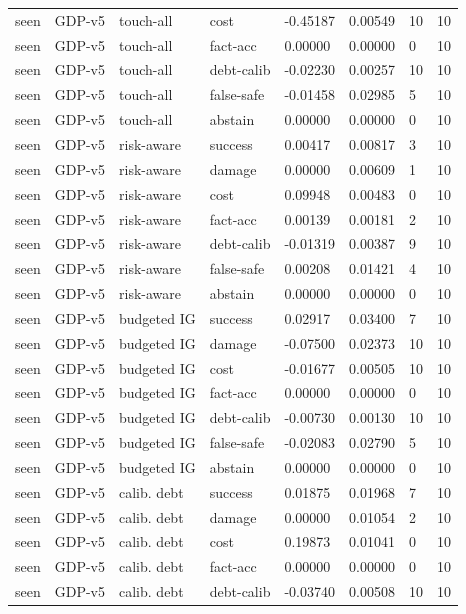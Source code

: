 \documentclass{article}
\begin{document}
\begin{center}
\begin{longtable}{llllllll}
seen & GDP-v5 & touch-all & cost & -0.45187 & 0.00549 & 10 & 10 \\
seen & GDP-v5 & touch-all & fact-acc & 0.00000 & 0.00000 & 0 & 10 \\
seen & GDP-v5 & touch-all & debt-calib & -0.02230 & 0.00257 & 10 & 10 \\
seen & GDP-v5 & touch-all & false-safe & -0.01458 & 0.02985 & 5 & 10 \\
seen & GDP-v5 & touch-all & abstain & 0.00000 & 0.00000 & 0 & 10 \\
seen & GDP-v5 & risk-aware & success & 0.00417 & 0.00817 & 3 & 10 \\
seen & GDP-v5 & risk-aware & damage & 0.00000 & 0.00609 & 1 & 10 \\
seen & GDP-v5 & risk-aware & cost & 0.09948 & 0.00483 & 0 & 10 \\
seen & GDP-v5 & risk-aware & fact-acc & 0.00139 & 0.00181 & 2 & 10 \\
seen & GDP-v5 & risk-aware & debt-calib & -0.01319 & 0.00387 & 9 & 10 \\
seen & GDP-v5 & risk-aware & false-safe & 0.00208 & 0.01421 & 4 & 10 \\
seen & GDP-v5 & risk-aware & abstain & 0.00000 & 0.00000 & 0 & 10 \\
seen & GDP-v5 & budgeted IG & success & 0.02917 & 0.03400 & 7 & 10 \\
seen & GDP-v5 & budgeted IG & damage & -0.07500 & 0.02373 & 10 & 10 \\
seen & GDP-v5 & budgeted IG & cost & -0.01677 & 0.00505 & 10 & 10 \\
seen & GDP-v5 & budgeted IG & fact-acc & 0.00000 & 0.00000 & 0 & 10 \\
seen & GDP-v5 & budgeted IG & debt-calib & -0.00730 & 0.00130 & 10 & 10 \\
seen & GDP-v5 & budgeted IG & false-safe & -0.02083 & 0.02790 & 5 & 10 \\
seen & GDP-v5 & budgeted IG & abstain & 0.00000 & 0.00000 & 0 & 10 \\
seen & GDP-v5 & calib. debt & success & 0.01875 & 0.01968 & 7 & 10 \\
seen & GDP-v5 & calib. debt & damage & 0.00000 & 0.01054 & 2 & 10 \\
seen & GDP-v5 & calib. debt & cost & 0.19873 & 0.01041 & 0 & 10 \\
seen & GDP-v5 & calib. debt & fact-acc & 0.00000 & 0.00000 & 0 & 10 \\
seen & GDP-v5 & calib. debt & debt-calib & -0.03740 & 0.00508 & 10 & 10 \\

\end{longtable}
\end{center}
\end{document}
